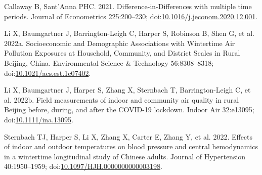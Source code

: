 \documentclass[
  letterpaper,
  DIV=11,
  numbers=noendperiod]{scrartcl}
\newlength{\cslhangindent}
\newenvironment{CSLReferences}[2] %
 {\begin{list}{}{%
  \setlength{\itemindent}{0pt}
  \setlength{\leftmargin}{0pt}
  \setlength{\parsep}{0pt}
  \ifodd #1
   \setlength{\leftmargin}{\cslhangindent}
   \setlength{\itemindent}{-1\cslhangindent}
  \fi
  \setlength{\itemsep}{#2\baselineskip}}}
 {\end{list}}
\begin{document}
\label{refs}
\begin{CSLReferences}{1}{1}
Callaway B, Sant'Anna PHC. 2021. Difference-in-{Differences} with
multiple time periods. Journal of Econometrics 225:200--230;
doi:\href{https://doi.org/10.1016/j.jeconom.2020.12.001}{10.1016/j.jeconom.2020.12.001}.

Li X, Baumgartner J, Barrington-Leigh C, Harper S, Robinson B, Shen G,
et al. 2022a. Socioeconomic and {Demographic Associations} with
{Wintertime Air Pollution Exposures} at {Household}, {Community}, and
{District Scales} in {Rural Beijing}, {China}. Environmental Science \&
Technology 56:8308--8318;
doi:\href{https://doi.org/10.1021/acs.est.1c07402}{10.1021/acs.est.1c07402}.

Li X, Baumgartner J, Harper S, Zhang X, Sternbach T, Barrington-Leigh C,
et al. 2022b. Field measurements of indoor and community air quality in
rural {Beijing} before, during, and after the {COVID-19} lockdown.
Indoor Air 32:e13095;
doi:\href{https://doi.org/10.1111/ina.13095}{10.1111/ina.13095}.

Sternbach TJ, Harper S, Li X, Zhang X, Carter E, Zhang Y, et al. 2022.
Effects of indoor and outdoor temperatures on blood pressure and central
hemodynamics in a wintertime longitudinal study of {Chinese} adults.
Journal of Hypertension 40:1950--1959;
doi:\href{https://doi.org/10.1097/HJH.0000000000003198}{10.1097/HJH.0000000000003198}.

\end{CSLReferences}
\end{document}

